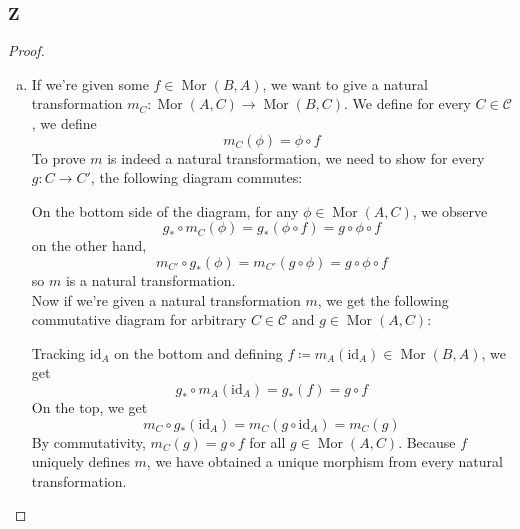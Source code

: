 \documentclass{article}
\newcommand{\id}{\mathrm{id}}
\newcommand{\fC}{\mathscr{C}}
\DeclareMathOperator{\Mor}{\mathrm{Mor}}
\begin{document}
\subsubsection{Z}\label{1.3.Z}
\begin{proof}
    \begin{enumerate}[(a)]
        \item If we're given some $f\in \Mor(B,A)$, we want to give a natural transformation $m_C:\Mor(A,C)\to \Mor(B,C)$. We define for every $C\in \fC$, we define
        \[
        m_C(\phi)=\phi\circ f
        \]
        To prove $m$ is indeed a natural transformation, we need to show for every $g:C\to C'$, the following diagram commutes:
        \begin{center}
        \end{center}
        On the bottom side of the diagram, for any $\phi\in \Mor(A,C)$, we observe
        \[
        g_*\circ m_C(\phi)=g_*(\phi\circ f)=g\circ \phi\circ f
        \]
        on the other hand,
        \[
        m_{C'}\circ g_*(\phi)=m_{C'}(g\circ \phi)=g\circ \phi \circ f
        \]
        so $m$ is a natural transformation.\\
        \newline
        Now if we're given a natural transformation $m$, we get the following commutative diagram for arbitrary $C\in \fC$ and $g\in \Mor(A,C)$:
        \begin{center}
        \end{center}
        Tracking $\id_A$ on the bottom and defining $f\coloneqq m_A(\id_A)\in \Mor(B,A)$, we get
        \[
        g_*\circ m_A(\id_A)=g_*(f)=g\circ f
        \]
        On the top, we get
        \[
        m_C\circ g_*(\id_A)=m_C(g\circ \id_A)=m_C(g)
        \]
        By commutativity, $m_C(g)=g\circ f$ for all $g\in \Mor(A,C)$. Because $f$ uniquely defines $m$, we have obtained a unique morphism from every natural transformation.\\

\end{enumerate}
\end{proof}
\end{document}
